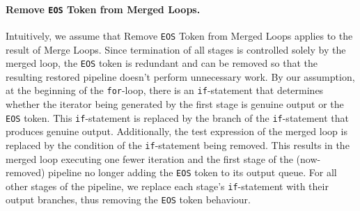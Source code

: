
\paragraph{Remove \lstinline{EOS}  Token from Merged Loops.}

Intuitively, we assume that Remove \lstinline{EOS}  Token from Merged Loops applies to the result of Merge Loops. Since termination of all stages is controlled solely by the merged loop, the \lstinline{EOS}  token is redundant and can be removed so that the resulting restored pipeline doesn't perform unnecessary work.
%
By our assumption, at the beginning of the \lstinline|for|-loop, there is an \lstinline|if|-statement that determines whether the iterator being generated by the first stage is genuine output or the \lstinline{EOS}  token. This \lstinline|if|-statement is replaced by the branch of the \lstinline|if|-statement that produces genuine output. Additionally, the test expression of the merged loop is replaced by the condition of the \lstinline|if|-statement being removed. This results in the merged loop executing one fewer iteration and the first stage of the (now-removed) pipeline no longer adding the \lstinline{EOS}  token to its output queue.
%
For all other stages of the pipeline, we replace each stage's \lstinline|if|-statement with their output branches, thus removing the \lstinline{EOS}  token behaviour.

